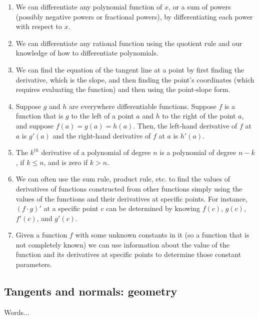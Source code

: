 \documentclass[10pt]{amsart}
\begin{document}
\begin{enumerate}

\item We can differentiate any polynomial function of $x$, or a sum of
  powers (possibly negative powers or fractional powers), by
  differentiating each power with respect to $x$.
\item We can differentiate any rational function using the quotient
  rule and our knowledge of how to differentiate polynomials.
\item We can find the equation of the tangent line at a point by first
  finding the derivative, which is the slope, and then finding the
  point's coordinates (which requires evaluating the function) and
  then using the point-slope form.
\item Suppose $g$ and $h$ are everywhere differentiable
  functions. Suppose $f$ is a function that is $g$ to the left of a
  point $a$ and $h$ to the right of the point $a$, and suppose $f(a) =
  g(a) = h(a)$. Then, the left-hand derivative of $f$ at $a$ is
  $g'(a)$ and the right-hand derivative of $f$ at $a$ is $h'(a)$.
\item The $k^{th}$ derivative of a polynomial of degree $n$ is a
  polynomial of degree $n - k$, if $k \le n$, and is zero if $k > n$.
\item We can often use the sum rule, product rule, etc. to find the
  values of derivatives of functions constructed from other functions
  simply using the values of the functions and their derivatives at
  specific points. For instance, $(f \cdot g)'$ at a specific point
  $c$ can be determined by knowing $f(c)$, $g(c)$, $f'(c)$, and
  $g'(c)$.
\item Given a function $f$ with some unknown constants in it (so a
  function that is not completely known) we can use information about
  the value of the function and its derivatives at specific points to
  determine those constant parameters.
\end{enumerate}

\subsection{Tangents and normals: geometry}

Words...
\end{document}
